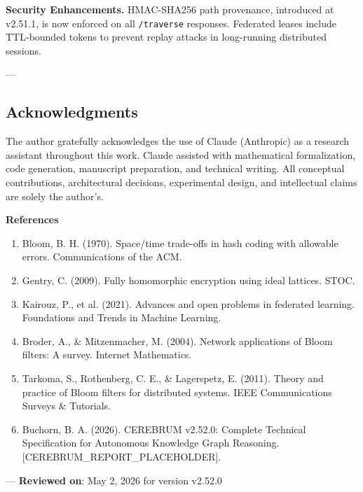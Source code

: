 \textbf{Security Enhanc\-ements.} HMAC-SHA256 path provenance, introduced at v2.51.1, is now enforced on all \texttt{/traverse} responses. Federated leases include TTL-bounded tokens to prevent replay attacks in long-running distributed sessions.

---
\subsection{Acknow\-ledgments}

The author gratefully ackno\-wledges the use of Claude (Anthropic) as a research assistant throughout this work. Claude assisted with mathe\-matical forma\-lization, code generation, manuscript preparation, and technical writing. All conceptual contr\-ibutions, archi\-tectural decisions, exper\-imental design, and intel\-lectual claims are solely the author's.

\textbf{References}
\begin{enumerate}
\item Bloom, B. H. (1970). Space/time trade-offs in hash coding with allowable errors. Commun\-ications of the ACM.
\item Gentry, C. (2009). Fully homomorphic encryption using ideal lattices. STOC.
\item Kairouz, P., et al. (2021). Advances and open problems in federated learning. Foundations and Trends in Machine Learning.
\item Broder, A., \& Mitzen\-macher, M. (2004). Network appli\-cations of Bloom filters: A survey. Internet Mathematics.
\item Tarkoma, S., Rothenberg, C. E., \& Lagerspetz, E. (2011). Theory and practice of Bloom filters for distributed systems. IEEE Commun\-ications Surveys \& Tutorials.
\item Buchorn, B. A. (2026). CEREBRUM v2.52.0: Complete Technical Specif\-ication for Autonomous Knowledge Graph Reasoning. [CEREBRUM\_REPORT\_PLACEHOLDER].

\end{enumerate}
---
\textbf{Reviewed on}: May 2, 2026 for version v2.52.0
